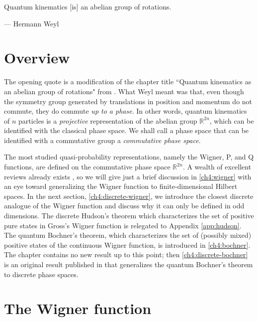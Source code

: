\newcommand\rep{U}
\setlength\epigraphwidth{9.25cm}
\epigraph{Quantum kinematics [is] an abelian group of rotations.}{--- Hermann Weyl}

\section{Overview}

The opening quote is a modification of the chapter title ``Quantum kinematics as an abelian group of rotations" from \cite{weyl1950qm}. What Weyl meant was that, even though the symmetry group generated by translations in position and momentum do not commute, they do commute \emph{up to a phase}. In other words, quantum kinematics of $n$ particles is a \emph{projective} representation of the abelian group $\mathbb{R}^{2n}$, which can be identified with the classical phase space. We shall call a phase space that can be identified with a commutative group a \emph{commutative phase space}.

The most studied quasi-probability representations, namely the Wigner, P, and Q functions, are defined on the commutative phase space $\mathbb{R}^{2n}$. A wealth of excellent reviews already exists \cite{hillery_distribution_1984, lee_theory_1995}, so we will give just a brief discussion in \autoref{ch4:wigner} with an eye toward generalizing the Wigner function to finite-dimensional Hilbert spaces. In the next section, \autoref{ch4:discrete-wigner}, we introduce the closest discrete analogue of the Wigner function \cite{gross_hudsons_2006,gross_non-negative_2007} and discuss why it can only be defined in odd dimensions. The discrete Hudson's theorem which characterizes the set of positive pure states in Gross's Wigner function is relegated to Appendix \ref{app:hudson}. The quantum Bochner's theorem, which characterizes the set of (possibly mixed) positive states of the continuous Wigner function, is introduced in \autoref{ch4:bochner}. The chapter contains no new result up to this point; then \autoref{ch4:discrete-bochner} is an original result published in \cite{dangniam_quantum_2015} that generalizes the quantum Bochner's theorem to discrete phase spaces.  %

\section{The Wigner function}\label{ch4:wigner}

